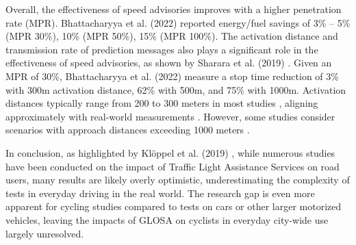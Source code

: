 Overall, the effectiveness of speed advisories improves with a higher penetration rate (MPR). Bhattacharyya et al. (2022) \cite{bhattacharyya_assessing_2022} reported energy/fuel savings of 3\% -- 5\% (MPR 30\%), 10\% (MPR 50\%), 15\% (MPR 100\%). The activation distance and transmission rate of prediction messages also plays a significant role in the effectiveness of speed advisories, as shown by Sharara et al. (2019) \cite{sharara_impact_2019}. Given an MPR of 30\%, Bhattacharyya et al. (2022) \cite{bhattacharyya_assessing_2022} measure a stop time reduction of 3\% with 300m activation distance, 62\% with 500m, and 75\% with 1000m. Activation distances typically range from 200 to 300 meters in most studies \cite{xia_indirect_2011, raubitschek_predictive_2011, rakha_eco-driving_2011, rakha_aeris_2012, mahler_reducing_2012, tal_vehicular-communications-based_2016, xu_bb_2015, de_nunzio_eco-driving_2015, luo_green_2017, kloeppel_performance_2019, dabiri_optimized_2020, hu_lane-level_2023}, aligning approximately with real-world measurements \cite{bernais_design_2016}. However, some studies consider scenarios with approach distances exceeding 1000 meters \cite{tielert_impact_2010, asadi_predictive_2011, krajzewicz_preparing_2012, nguyen_efficient_2016, karoui_efficiency_2018, plianos_predictive_2018, sharara_impact_2019, simchon_real-time_2020, bhattacharyya_assessing_2022}.

In conclusion, as highlighted by Klöppel et al. (2019) \cite{kloeppel_performance_2019}, while numerous studies have been conducted on the impact of Traffic Light Assistance Services on road users, many results are likely overly optimistic, underestimating the complexity of tests in everyday driving in the real world. The research gap is even more apparent for cycling studies compared to tests on cars or other larger motorized vehicles, leaving the impacts of GLOSA on cyclists in everyday city-wide use largely unresolved.

